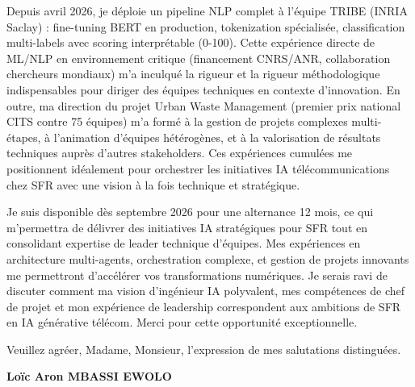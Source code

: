 \documentclass[a4paper,11pt]{article}
\begin{document}
\vspace{0.8em}
\noindent Depuis avril 2026, je déploie un pipeline NLP complet à l'équipe TRIBE (INRIA Saclay) : fine-tuning BERT en production, tokenization spécialisée, classification multi-labels avec scoring interprétable (0-100). Cette expérience directe de ML/NLP en environnement critique (financement CNRS/ANR, collaboration chercheurs mondiaux) m'a inculqué la rigueur et la rigueur méthodologique indispensables pour diriger des équipes techniques en contexte d'innovation. En outre, ma direction du projet Urban Waste Management (premier prix national CITS contre 75 équipes) m'a formé à la gestion de projets complexes multi-étapes, à l'animation d'équipes hétérogènes, et à la valorisation de résultats techniques auprès d'autres stakeholders. Ces expériences cumulées me positionnent idéalement pour orchestrer les initiatives IA télécommunications chez SFR avec une vision à la fois technique et stratégique.

\vspace{0.8em}
\noindent Je suis disponible dès septembre 2026 pour une alternance 12 mois, ce qui m'permettra de délivrer des initiatives IA stratégiques pour SFR tout en consolidant expertise de leader technique d'équipes. Mes expériences en architecture multi-agents, orchestration complexe, et gestion de projets innovants me permettront d'accélérer vos transformations numériques. Je serais ravi de discuter comment ma vision d'ingénieur IA polyvalent, mes compétences de chef de projet et mon expérience de leadership correspondent aux ambitions de SFR en IA générative télécom. Merci pour cette opportunité exceptionnelle.

\vspace{1.5em}
\noindent Veuillez agr\'eer, Madame, Monsieur, l'expression de mes salutations distingu\'ees.

\vspace{2em}
\noindent \textbf{Lo\"ic Aron MBASSI EWOLO}
\end{document}
